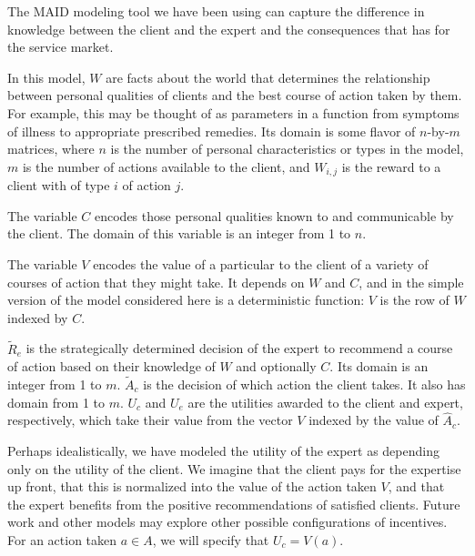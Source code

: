 \documentclass[../thesis.tex]{subfiles}
\begin{document}
The MAID modeling tool we have been using can capture
the difference in knowledge between the client and
the expert and the consequences that has for the service
market.

\begin{center}
\end{center}

In this model, $W$ are facts about the world that
determines the relationship between personal qualities
of clients and the best course of action taken by them.
For example, this may be thought of as parameters in
a function from symptoms of illness to appropriate prescribed
remedies.
Its domain is some flavor of $n$-by-$m$ matrices, where
$n$ is the number of personal characteristics or types in the model,
$m$ is the number of actions available to the client,
and $W_{i,j}$ is the reward to a client with of type $i$
of action $j$.

The variable $C$ encodes those personal qualities known to
and communicable by the client.
The domain of this variable is an integer from 1 to $n$.

The variable $V$ encodes the value of a particular to the client
of a variety of courses of action that they might take.
It depends on $W$ and $C$, and in the simple version of the
model considered here is a deterministic function: $V$
is the row of $W$ indexed by $C$.

$\tilde{R}_e$ is the strategically determined decision of
the expert to recommend a course of action based on their
knowledge of $W$ and optionally $C$. Its domain is an
integer from 1 to $m$.
$\tilde{A}_c$ is the decision of which action the client takes.
It also has domain from 1 to $m$.
$U_c$ and $U_e$ are the utilities awarded to the client and expert,
respectively, which take their value from the vector $V$ indexed
by the value of $\hat{A}_c$.

Perhaps idealistically, we have modeled the utility
of the expert as depending only on the utility of the
client.
We imagine that the client pays for the expertise
up front, that this is normalized into the value
of the action taken $V$, and that the expert
benefits from the positive recommendations of
satisfied clients.
Future work and other models may explore other
possible configurations of incentives.
For an action taken $a \in A$, we will
specify that $U_c = V(a)$.
\end{document}
